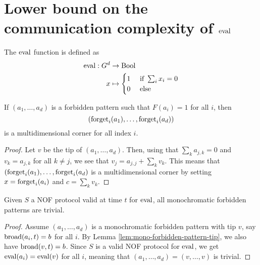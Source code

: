 \chapter{Lower bound on the communication complexity of $\operatorname{eval}$}

\begin{definition}
  \label{def:eval}
  \leanok

  The $\operatorname{eval}$ function is defined as
  \begin{align}
      \operatorname{eval} : G^d & \to \operatorname{Bool} \\
      x & \mapsto \begin{cases}
      1 & \text{ if } \sum_i x_i = 0 \\
      0 & \text{ else}
    \end{cases}
  \end{align}
\end{definition}

\begin{lemma}
  \label{lem:forbidden-pattern-project-multicorner}

  If $(a_1, \dots, a_d)$ is a forbidden pattern such that $F(a_i) = 1$ for all $i$, then
  $$(\operatorname{forget}_i(a_1), \dots, \operatorname{forget}_i(a_d))$$
  is a multidimensional corner for all index $i$.
\end{lemma}
\begin{proof}

  Let $v$ be the tip of $(a_1, \dots, a_d)$. Then, using that $\sum_k a_{j, k} = 0$ and $v_k = a_{j, k}$ for all $k \ne j$, we see that $v_j = a_{j, j} + \sum_k v_k$. This means that $(\operatorname{forget}_i(a_1), \dots, \operatorname{forget}_i(a_d)$ is a multidimensional corner by setting $x = \operatorname{forget}_i(a_i)$ and $c = \sum_k v_k$.
\end{proof}

\begin{lemma}
  \label{lem:mono-forbidden-pattern-trivial}

  Given $S$ a NOF protocol valid at time $t$ for $\operatorname{eval}$, all monochromatic forbidden patterns are trivial.
\end{lemma}
\begin{proof}

  Assume $(a_1, \dots, a_d)$ is a monochromatic forbidden pattern with tip $v$, say $\operatorname{broad}(a_i, t) = b$ for all $i$. By Lemma \ref{lem:mono-forbidden-pattern-tip}, we also have $\operatorname{broad}(v, t) = b$. Since $S$ is a valid NOF protocol for $\operatorname{eval}$, we get $\operatorname{eval}(a_i) = \operatorname{eval}(v)$ for all $i$, meaning that $(a_1, \dots, a_d) = (v, \dots, v)$ is trivial.
\end{proof}
